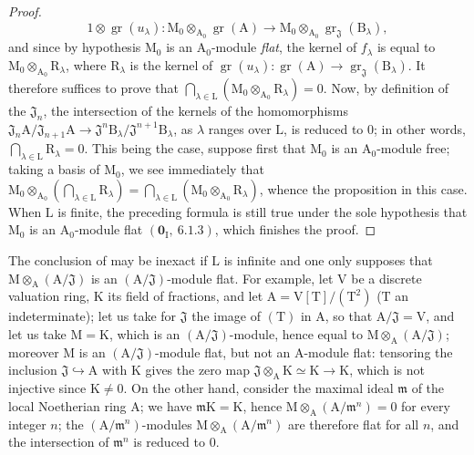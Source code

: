 \begin{proof}
\[
1\otimes\operatorname{gr}(u_\lambda) : \mathrm{M}_0\otimes_{\mathrm{A}_0}\operatorname{gr}(\mathrm{A}) \to \mathrm{M}_0\otimes_{\mathrm{A}_0}\operatorname{gr}_\mathfrak{J}(\mathrm{B}_\lambda),
\]
and since by hypothesis $\mathrm{M}_0$ is an $\mathrm{A}_0$-module \emph{flat}, the kernel of $f_\lambda$ is equal to $\mathrm{M}_0\otimes_{\mathrm{A}_0}\mathrm{R}_\lambda$,
where $\mathrm{R}_\lambda$ is the kernel of $\operatorname{gr}(u_\lambda):\operatorname{gr}(\mathrm{A})\to\operatorname{gr}_\mathfrak{J}(\mathrm{B}_\lambda)$. It therefore suffices to prove that
$\bigcap_{\lambda\in\mathrm{L}}(\mathrm{M}_0\otimes_{\mathrm{A}_0}\mathrm{R}_\lambda)=0$. Now, by definition of the $\mathfrak{J}_n$, the intersection of the kernels of the homomorphisms
$\mathfrak{J}_n\mathrm{A}/\mathfrak{J}_{n+1}\mathrm{A}\to\mathfrak{J}^n\mathrm{B}_\lambda/\mathfrak{J}^{n+1}\mathrm{B}_\lambda$, as $\lambda$ ranges over $\mathrm{L}$, is reduced to $0$; in other
words, $\bigcap_{\lambda\in\mathrm{L}}\mathrm{R}_\lambda=0$. This being the case, suppose first that $\mathrm{M}_0$ is an $\mathrm{A}_0$-module free; taking
a basis of $\mathrm{M}_0$, we see immediately that $\mathrm{M}_0\otimes_{\mathrm{A}_0}(\bigcap_{\lambda\in\mathrm{L}}\mathrm{R}_\lambda)=\bigcap_{\lambda\in\mathrm{L}}(\mathrm{M}_0\otimes_{\mathrm{A}_0}\mathrm{R}_\lambda)$, whence the
proposition in this case. When $\mathrm{L}$ is finite, the preceding formula is still true under
the sole hypothesis that $\mathrm{M}_0$ is an $\mathrm{A}_0$-module flat $(\mathbf{0}_\mathrm{I},~6.1.3)$, which finishes the
proof.
\end{proof}

\begin{remark}[11.4.2]
\label{IV.11.4.2}
The conclusion of  may be inexact if $\mathrm{L}$ is infinite
and one only supposes that $\mathrm{M}\otimes_\mathrm{A}(\mathrm{A}/\mathfrak{J})$ is an $(\mathrm{A}/\mathfrak{J})$-module flat. For example,
let $\mathrm{V}$ be a discrete valuation ring, $\mathrm{K}$ its field of fractions, and let $\mathrm{A}=\mathrm{V}[\mathrm{T}]/(\mathrm{T}^2)$
($\mathrm{T}$ an indeterminate); let us take for $\mathfrak{J}$ the image of $(\mathrm{T})$ in $\mathrm{A}$, so that $\mathrm{A}/\mathfrak{J}=\mathrm{V}$, and
let us take $\mathrm{M}=\mathrm{K}$, which is an $(\mathrm{A}/\mathfrak{J})$-module, hence equal to $\mathrm{M}\otimes_\mathrm{A}(\mathrm{A}/\mathfrak{J})$; moreover $\mathrm{M}$ is
an $(\mathrm{A}/\mathfrak{J})$-module flat, but not an $\mathrm{A}$-module flat: tensoring the inclusion $\mathfrak{J}\hookrightarrow\mathrm{A}$ with $\mathrm{K}$
gives the zero map $\mathfrak{J}\otimes_{\mathrm{A}}\mathrm{K}\simeq\mathrm{K}\longrightarrow\mathrm{K}$,
which is not injective since $\mathrm{K}\neq0$. On the other hand, consider the maximal ideal $\mathfrak{m}$ of the local Noetherian
ring $\mathrm{A}$; we have $\mathfrak{m}\mathrm{K}=\mathrm{K}$, hence $\mathrm{M}\otimes_\mathrm{A}(\mathrm{A}/\mathfrak{m}^n)=0$ for every integer $n$; the $(\mathrm{A}/\mathfrak{m}^n)$-modules
$\mathrm{M}\otimes_\mathrm{A}(\mathrm{A}/\mathfrak{m}^n)$ are therefore flat for all $n$, and the intersection of $\mathfrak{m}^n$ is reduced to $0$.
\end{remark}

